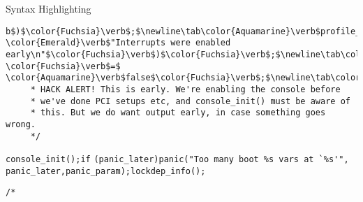 \begin{frame}{Syntax Highlighting}
\begin{verbatim}
b$)$\color{Fuchsia}\verb$;$\newline\tab\color{Aquamarine}\verb$profile_init$\color{Fuchsia}\verb$($\color{Fuchsia}\verb$)$\color{Fuchsia}\verb$;$\newline\tab\color{Aquamarine}\verb$call_function_init$\color{Fuchsia}\verb$($\color{Fuchsia}\verb$)$\color{Fuchsia}\verb$;$\newline\tab\color{Aquamarine}\verb$WARN$\color{Fuchsia}\verb$($\color{Goldenrod}\verb$!$\color{Aquamarine}\verb$irqs_disabled$\color{Fuchsia}\verb$($\color{Fuchsia}\verb$)$\color{Fuchsia}\verb$,$ \color{Emerald}\verb$"Interrupts were enabled early\n"$\color{Fuchsia}\verb$)$\color{Fuchsia}\verb$;$\newline\tab\color{Aquamarine}\verb$early_boot_irqs_disabled$ \color{Fuchsia}\verb$=$ \color{Aquamarine}\verb$false$\color{Fuchsia}\verb$;$\newline\tab\color{Aquamarine}\verb$local_irq_enable$\color{Fuchsia}\verb$($\color{Fuchsia}\verb$)$\color{Fuchsia}\verb$;$\newline\newline\tab\color{Aquamarine}\verb$kmem_cache_init_late$\color{Fuchsia}\verb$($\color{Fuchsia}\verb$)$\color{Fuchsia}\verb$;$\newline\newline\tab\color{Rhodamine}\begin{verbatim}/*
	 * HACK ALERT! This is early. We're enabling the console before
	 * we've done PCI setups etc, and console_init() must be aware of
	 * this. But we do want output early, in case something goes wrong.
	 */\end{verbatim}\leavevmode\newline\tab\color{Aquamarine}\verb$console_init$\color{Fuchsia}\verb$($\color{Fuchsia}\verb$)$\color{Fuchsia}\verb$;$\newline\tab\color{BurntOrange}\verb$if$ \color{Fuchsia}\verb$($\color{Aquamarine}\verb$panic_later$\color{Fuchsia}\verb$)$\newline\tab\tab\color{Aquamarine}\verb$panic$\color{Fuchsia}\verb$($\color{Emerald}\verb$"Too many boot %s vars at `%s'"$\color{Fuchsia}\verb$,$ \color{Aquamarine}\verb$panic_later$\color{Fuchsia}\verb$,$\newline\tab\tab      \color{Aquamarine}\verb$panic_param$\color{Fuchsia}\verb$)$\color{Fuchsia}\verb$;$\newline\newline\tab\color{Aquamarine}\verb$lockdep_info$\color{Fuchsia}\verb$($\color{Fuchsia}\verb$)$\color{Fuchsia}\verb$;$\newline\newline\tab\color{Rhodamine}\begin{verbatim}/*

\end{verbatim}
\end{frame}
